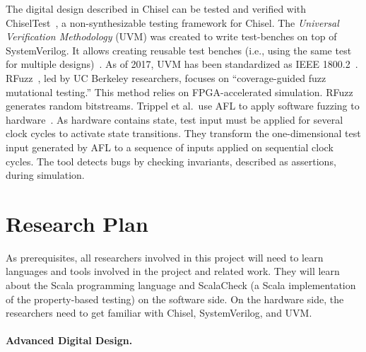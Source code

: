 \documentclass[fleqn,12pt]{article}
\begin{document}
The digital design described in Chisel can be tested and verified with
ChiselTest~\cite{chisel:tester2}, a non-synthesizable testing framework for Chisel.
The \textit{Universal Verification Methodology} (UVM) was created to write test-benches on top of SystemVerilog. 
It allows creating reusable test benches (i.e., using the same test for multiple designs)~\cite{uvm2015b}.
As of 2017, UVM has been standardized as IEEE 1800.2~\cite{IEEE:18002}.
RFuzz~\cite{rfuzz2018}, led by UC Berkeley researchers, focuses on ``coverage-guided fuzz mutational testing.''
This method relies on FPGA-accelerated simulation.
RFuzz generates random bitstreams.
Trippel et al.~use AFL to apply software fuzzing to hardware~\cite{DBLP:journals/corr/abs-2102-02308}.
As hardware contains state, test input must be applied for several clock cycles to activate state transitions.
They transform the one-dimensional test input generated by AFL to a sequence of inputs applied
on sequential clock cycles. The tool detects bugs by checking invariants, described as assertions, during simulation.

%


\section{Research Plan}

As prerequisites, all researchers involved in this project will need to learn
languages and tools involved in the project and related work.
They will learn about the Scala programming language and ScalaCheck
(a Scala implementation of the property-based testing) on the software side.
On the hardware side,
the researchers need to get familiar with Chisel, SystemVerilog, and
UVM.


\paragraph{Advanced Digital Design.}
\end{document}
